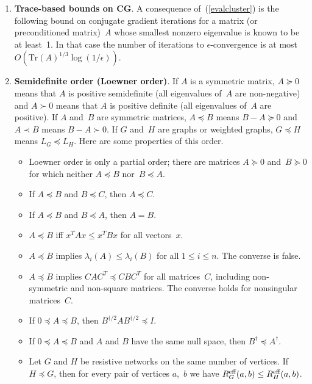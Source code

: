 \documentclass[11pt]{article}
\newcommand{\Reff}{R^{\mbox{\scriptsize eff}}}  %
\newcommand{\pinv}{^{\dagger}}          %
\newcommand{\pinvroot}{^{\dagger/2}}    %
\newcommand{\Tr}{\mbox{Tr}}             %
\begin{document}
\begin{enumerate}
\item{\bf Trace-based bounds on CG}.
A consequence of~(\ref{evalcluster}) is the following bound on
conjugate gradient iterations for a matrix (or preconditioned matrix)~$A$
whose smallest nonzero eigenvalue is known to be at least~1.
In that case the number of iterations to $\epsilon$-convergence
is at most $O(\Tr(A)^{1/3}\log(1/\epsilon))$.

\item {\bf Semidefinite order (Loewner order)}.
If $A$ is a symmetric matrix, 
$A\succeq 0$ means that $A$ is positive semidefinite 
(all eigenvalues of~$A$ are non-negative) and
$A\succ 0$ means that $A$ is positive definite
(all eigenvalues of~$A$ are positive).
If $A$ and~$B$ are symmetric matrices, 
$A\preceq B$ means $B-A\succeq 0$ and
$A\prec B$ means $B-A\succ 0$.
If $G$ and~$H$ are graphs or weighted graphs, 
$G\preceq H$ means $L_G\preceq L_H$.
Here are some properties of this order.

\begin{itemize}

\item Loewner order is only a partial order;
there are matrices $A\succeq 0$ and~$B\succeq 0$
for which neither $A\preceq B$ nor~$B\preceq A$.

\item If $A\preceq B$ and $B\preceq C$, then $A\preceq C$.

\item If $A\preceq B$ and $B\preceq A$, then $A=B$.

\item $A\preceq B$ iff $x^TAx \leq x^TBx$ for all vectors~$x$.

\item $A\preceq B$ implies $\lambda_i(A) \leq \lambda_i(B)$
for all $1\leq i\leq n$. The converse is false.

\item $A\preceq B$ implies $CAC^T \preceq CBC^T$ for all matrices~$C$, 
including non-symmetric and non-square matrices. The converse holds
for nonsingular matrices~$C$.

\item If $0\preceq A\preceq B$, then $B\pinvroot A B\pinvroot \preceq I$.

\item If $0\preceq A\preceq B$ and $A$ and $B$ have the same null space,
then $B\pinv\preceq A\pinv$.

\item
Let $G$ and $H$ be resistive networks on the same number of vertices.
If $H\preceq G$, then for every pair of vertices $a$,~$b$ we have
$\Reff_G(a,b) \leq \Reff_H(a,b)$.


\end{itemize}
\end{enumerate}
\end{document}
